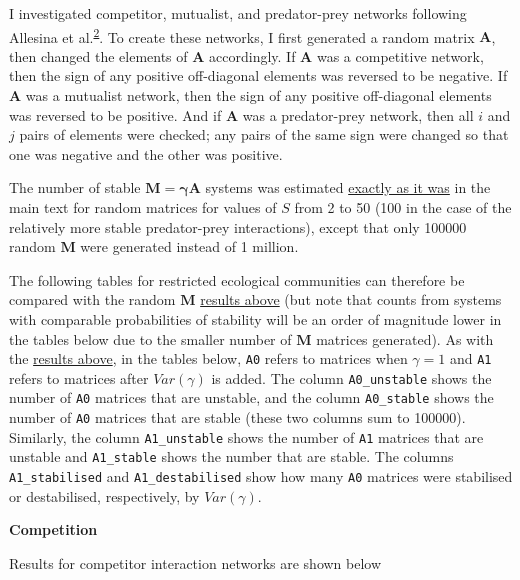 \documentclass[]{article}
\begin{document}
I investigated competitor, mutualist, and predator-prey networks
following Allesina et
al.\textsuperscript{\protect\hyperlink{ref-Allesina2012}{2}}. To create
these networks, I first generated a random matrix \(\mathbf{A}\), then
changed the elements of \(\mathbf{A}\) accordingly. If \(\mathbf{A}\)
was a competitive network, then the sign of any positive off-diagonal
elements was reversed to be negative. If \(\mathbf{A}\) was a mutualist
network, then the sign of any positive off-diagonal elements was
reversed to be positive. And if \(\mathbf{A}\) was a predator-prey
network, then all \(i\) and \(j\) pairs of elements were checked; any
pairs of the same sign were changed so that one was negative and the
other was positive.

The number of stable \(\mathbf{M = \gamma A}\) systems was estimated
\protect\hyperlink{IncrS}{exactly as it was} in the main text for random
matrices for values of \(S\) from 2 to 50 (100 in the case of the
relatively more stable predator-prey interactions), except that only
100000 random \(\mathbf{M}\) were generated instead of 1 million.

The following tables for restricted ecological communities can therefore
be compared with the random \(\mathbf{M}\)
\protect\hyperlink{IncrS}{results above} (but note that counts from
systems with comparable probabilities of stability will be an order of
magnitude lower in the tables below due to the smaller number of
\(\mathbf{M}\) matrices generated). As with the
\protect\hyperlink{IncrS}{results above}, in the tables below,
\texttt{A0} refers to matrices when \(\gamma = 1\) and \texttt{A1}
refers to matrices after \(Var(\gamma)\) is added. The column
\texttt{A0\_unstable} shows the number of \texttt{A0} matrices that are
unstable, and the column \texttt{A0\_stable} shows the number of
\texttt{A0} matrices that are stable (these two columns sum to 100000).
Similarly, the column \texttt{A1\_unstable} shows the number of
\texttt{A1} matrices that are unstable and \texttt{A1\_stable} shows the
number that are stable. The columns \texttt{A1\_stabilised} and
\texttt{A1\_destabilised} show how many \texttt{A0} matrices were
stabilised or destabilised, respectively, by \(Var(\gamma)\).

\textbf{Competition}

Results for competitor interaction networks are shown below
\end{document}
